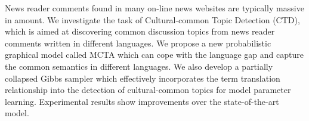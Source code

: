 News reader comments found in many on-line news websites are typically massive in amount. We investigate the task of Cultural-common Topic Detection (CTD), which is aimed at discovering common discussion topics from news reader comments written in different languages. We propose a new probabilistic graphical model called MCTA which can cope with the language gap and capture the common semantics in different languages. We also develop a partially collapsed Gibbs sampler which effectively incorporates the term translation relationship into the detection of cultural-common topics for model parameter learning. Experimental results show improvements over the state-of-the-art model.
